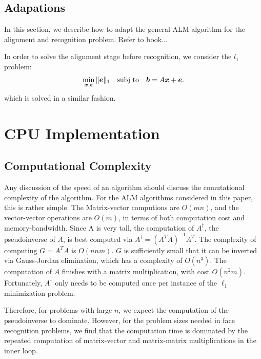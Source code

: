 \documentclass[10pt,twocolumn,letterpaper]{article}
\begin{document}

\subsection{Adapations}

In this section, we describe how to adapt the general ALM algorithm for the alignment and recognition problem.  Refer to book...

In order to solve the alignment stage before recognition, we consider the $l_1$ problem: 
\begin{equation} 
\min_{{\boldsymbol{x}}, \boldsymbol{e}} \|\boldsymbol{e}\|_1 \quad \textup{subj to} \quad \boldsymbol{b} = A {\boldsymbol{x}} + \boldsymbol{e}.
\end{equation}
which is solved in a similar fashion.

\section{CPU Implementation}

\subsection{Computational Complexity} Any discussion of the speed of an
algorithm should discuss the comutational complexity of the algorithm.  For the
ALM algorithms considered in this paper, this is rather simple.  The
Matrix-vector computions are $O(mn)$, and the vector-vector operations are
$O(m)$, in terms of both computation cost and memory-bandwidth.  Since A is
very tall, the computation of $A^\dagger$, the pseudoinverse of $A$, is best
computed via $A^\dagger = (A^TA)^{-1} A^T$.  The complexity of computing $G =
A^T A$ is $O(nnm)$.  $G$ is sufficiently small that it can be inverted via
Gauss-Jordan elimination, which has a complexity of $O(n^3)$.  The computation
of $A$ finishes with a matrix multiplication, with cost $O(n^2 m)$.
Fortunately, $A^\dagger$ only needs to be computed once per instance of the
$\ell_1$ minimization problem.

Therefore, for problems with large $n$, we expect the computation of the
pseudoinverse to dominate.  However, for the problem sizes needed in face
recognition problems, we find that the computation time is dominated by the
repeated computation of matrix-vector and matrix-matrix multiplications in the
inner loop.
\end{document}
